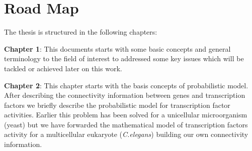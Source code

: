 % 
% 
% 

\section{Road Map}
The thesis is structured in the following chapters:

\textbf{Chapter 1}: This documents starts with some basic concepts and general terminology to the field of interest to addressed some key issues which will be tackled or achieved later on this work.

\textbf{Chapter 2}: This chapter starts with the basis concepts of probabilistic model. After describing the connectivity information between genes and transcription factors we briefly describe the probabilistic model for transcription factor activities. Earlier this problem has been solved for a unicellular microorganism (yeast) but we have forwarded the mathematical model of transcription factors activity for a multicellular eukaryote (\textit{C.elegans}) building our own connectivity information.
 
